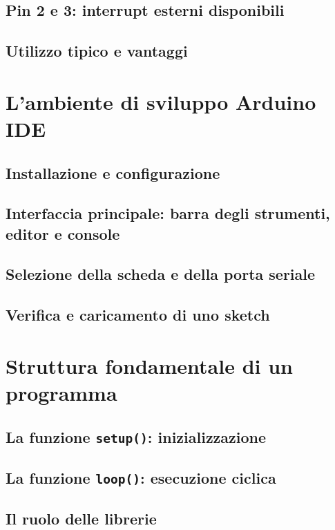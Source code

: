 \subsection*{Pin 2 e 3: interrupt esterni disponibili}
\subsection*{Utilizzo tipico e vantaggi}

\section{L'ambiente di sviluppo Arduino IDE}
\subsection*{Installazione e configurazione}
\subsection*{Interfaccia principale: barra degli strumenti, editor e console}
\subsection*{Selezione della scheda e della porta seriale}
\subsection*{Verifica e caricamento di uno sketch}

\section{Struttura fondamentale di un programma}
\subsection*{La funzione \texttt{setup()}: inizializzazione}
\subsection*{La funzione \texttt{loop()}: esecuzione ciclica}
\subsection*{Il ruolo delle librerie}